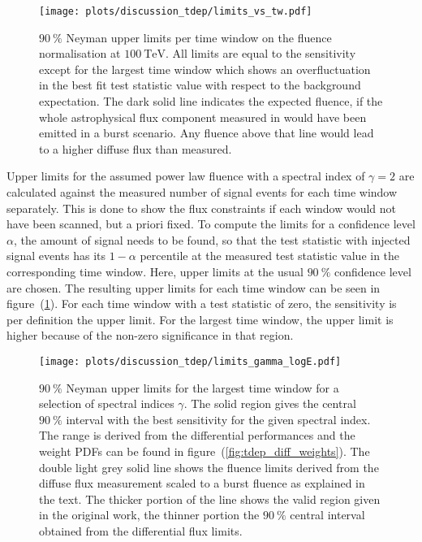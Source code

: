 \begin{figure}[htpb]
  \centering
  \texttt{[image: plots/discussion\_tdep/limits\_vs\_tw.pdf]}
  \caption[Fluence limits for each time windows for the time-dependent analysis]{
    $\SI{90}{\percent}$ Neyman upper limits per time window on the fluence normalisation at $\SI{100}{\TeV}$.
    All limits are equal to the sensitivity except for the largest time window which shows an overfluctuation in the best fit test statistic value with respect to the background expectation.
    The dark solid line indicates the expected fluence, if the whole astrophysical flux component measured in \cite{Haack:2017dxi} would have been emitted in a burst scenario.
    Any fluence above that line would lead to a higher diffuse flux than measured.
  }
  \label{fig:tdep_limits_vs_tw}
\end{figure}

Upper limits for the assumed power law fluence with a spectral index of $\gamma=2$ are calculated against the measured number of signal events for each time window separately.
This is done to show the flux constraints if each window would not have been scanned, but a priori fixed.
To compute the limits for a confidence level $\alpha$, the amount of signal needs to be found, so that the test statistic with injected signal events has its $1-\alpha$ percentile at the measured test statistic value in the corresponding time window.
Here, upper limits at the usual $\SI{90}{\percent}$ confidence level are chosen.
The resulting upper limits for each time window can be seen in figure~(\ref{fig:tdep_limits_vs_tw}).
For each time window with a test statistic of zero, the sensitivity is per definition the upper limit.
For the largest time window, the upper limit is higher because of the non-zero significance in that region.

\begin{figure}[htpb]
  \centering
  \texttt{[image: plots/discussion\_tdep/limits\_gamma\_logE.pdf]}
  \caption[Unbroken power-law fluence limits for the largest time window]{
    $\SI{90}{\percent}$ Neyman upper limits for the largest time window for a selection of spectral indices $\gamma$.
    The solid region gives the central $\SI{90}{\percent}$ interval with the best sensitivity for the given spectral index.
    The range is derived from the differential performances and the weight PDFs can be found in figure~(\ref{fig:tdep_diff_weights}).
    The double light grey solid line shows the fluence limits derived from the diffuse flux measurement scaled to a burst fluence as explained in the text.
    The thicker portion of the line shows the valid region given in the original work, the thinner portion the $\SI{90}{\percent}$ central interval obtained from the differential flux limits.
  }
  \label{fig:tdep_limits_gamma_logE}
\end{figure}


